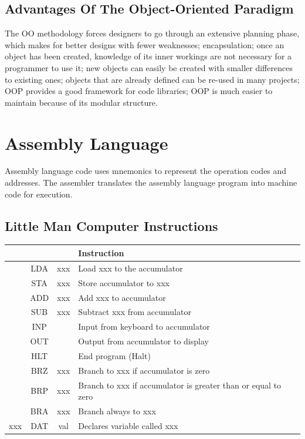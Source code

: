 \documentclass[a4paper,11pt, twocolumn]{article}
\begin{document}
\subsection{Advantages Of The Object-Oriented Paradigm}
The OO methodology forces designers to go through an extensive planning phase, which makes for better designs with fewer weaknesses; encapsulation; once an object has been created, knowledge of its inner workings are not necessary for a programmer to use it; new objects can easily be created with smaller differences to existing ones; objects that are already defined can be re-used in many projects; OOP provides a good framework for code libraries; OOP is much easier to maintain because of its modular structure. 

\section{Assembly Language}
Assembly language code uses mnemonics to represent the operation codes and addresses. The assembler translates the assembly language program into machine code for execution. 
\subsection{Little Man Computer Instructions}
\begin{table}[H]
    \centering
    \begin{tabularx}{0.45\textwidth}{ccc|X}
     &  &  & Instruction \\
     \hline
     & LDA & xxx & Load xxx to the accumulator \\
     & STA & xxx & Store accumulator to xxx \\
     & ADD & xxx & Add xxx to accumulator \\
     & SUB & xxx & Subtract xxx from accumulator \\
     & INP &  & Input from keyboard to accumulator \\
     & OUT &  & Output from accumulator to display \\
     & HLT &  & End program (Halt) \\
     & BRZ & xxx & Branch to xxx if accumulator is zero \\
     & BRP & xxx & Branch to xxx if accumulator is greater than or equal to zero \\
     & BRA & xxx & Branch always to xxx \\
    xxx & DAT & val & Declares variable called xxx
    \end{tabularx}
\end{table}
\end{document}
